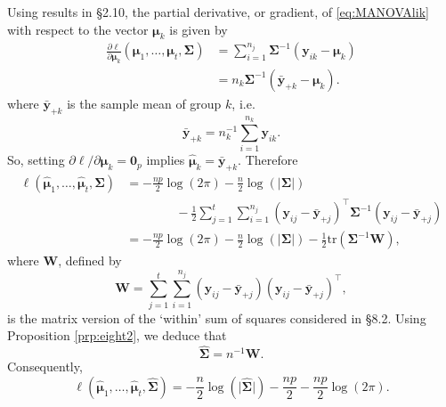 \documentclass[]{book}
\theoremstyle{definition}
\theoremstyle{definition}
\theoremstyle{definition}
\theoremstyle{remark}
\begin{document}
Using results in \S 2.10, the partial derivative, or gradient, of \eqref{eq:MANOVAlik} with respect to the vector \(\boldsymbol \mu_k\) is given by
\begin{align*}
 \frac{\partial \ell}{\partial \boldsymbol \mu_k}(\boldsymbol \mu_1, \ldots , \boldsymbol \mu_t, \boldsymbol \Sigma)&=\sum_{i=1}^{n_j} \boldsymbol \Sigma^{-1}(\boldsymbol y_{ik}-\boldsymbol \mu_k)\\
 &=n_k \boldsymbol \Sigma^{-1} (\bar{\boldsymbol y}_{+k}-\boldsymbol \mu_k).
 \end{align*}
where \(\bar{\boldsymbol y}_{+k}\) is the sample mean of group \(k\), i.e.
\[
\bar{\boldsymbol y}_{+k}=n_k^{-1}\sum_{i=1}^{n_k} \boldsymbol y_{ik}.
\]
So, setting \(\partial \ell/\partial \boldsymbol \mu_k={\mathbf 0}_p\) implies \(\hat{\boldsymbol \mu}_k=\bar{\boldsymbol y}_{+k}\).
Therefore
\begin{align*}
\ell(\hat{\boldsymbol \mu}_1, \ldots , \hat{\boldsymbol \mu}_t, \boldsymbol \Sigma)&= -\frac{np}{2}\log(2\pi)-\frac{n}{2}\log(\vert \boldsymbol \Sigma\vert)\\
&\qquad \qquad - \frac{1}{2} \sum_{j=1}^t \sum_{i=1}^{n_j} (\boldsymbol y_{ij}-\bar{\boldsymbol y}_{+j})^\top \boldsymbol \Sigma^{-1}
(\boldsymbol y_{ij}-\bar{\boldsymbol y}_{+j})\\
&=-\frac{n p}{2}\log(2\pi) -\frac{n}{2}\log(\vert \boldsymbol \Sigma\vert)-\frac{1}{2}\text{tr}(\boldsymbol \Sigma^{-1}\boldsymbol W),
\end{align*}
where \(\boldsymbol W\), defined by
\[
\boldsymbol W=\sum_{j=1}^t \sum_{i=1}^{n_j} (\boldsymbol y_{ij}-\bar{\boldsymbol y}_{+j})(\boldsymbol y_{ij}-\bar{\boldsymbol y}_{+j})^\top,
\]
is the matrix version of the `within' sum of squares considered in \S 8.2. Using Proposition \ref{prp:eight2}, we deduce that
\[
\hat{\boldsymbol \Sigma}=n^{-1}\boldsymbol W.
\]
Consequently,
\[
\ell(\hat{\boldsymbol \mu}_1, \ldots , \hat{\boldsymbol \mu}_t,\hat{\boldsymbol \Sigma})=-\frac{n}{2}\log(\vert \hat{\boldsymbol \Sigma}\vert)-\frac{np}{2}- \frac{np}{2}\log(2\pi).
\]
\end{document}

